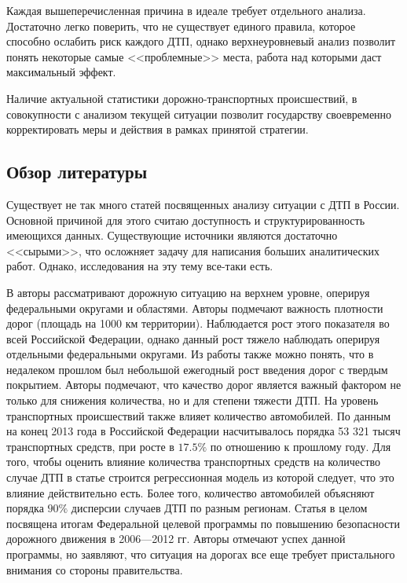 \documentclass[a4paper, 14pt]{article}
\begin{document}
Каждая вышеперечисленная причина в идеале требует отдельного анализа. Достаточно легко поверить, что не существует единого правила, которое способно ослабить риск каждого ДТП, однако верхнеуровневый анализ позволит понять некоторые самые <<проблемные>> места, работа над которыми даст максимальный эффект.

Наличие актуальной статистики дорожно-транспортных происшествий, в совокупности с анализом текущей ситуации позволит государству своевременно корректировать меры и действия в рамках принятой стратегии. 

\subsection{Обзор литературы}
Существует не так много статей посвященных анализу ситуации с ДТП в России. Основной причиной для этого считаю доступность и структурированность имеющихся данных. Существующие источники являются достаточно <<сырыми>>, что осложняет задачу для написания больших аналитических работ. Однако, исследования на эту тему все-таки есть.

В \cite{ivliev_econ_stat_analysis} авторы рассматривают дорожную ситуацию на верхнем уровне, оперируя федеральными округами и областями. Авторы подмечают важность плотности дорог (площадь на 1000 км территории). Наблюдается рост этого показателя во всей Российской Федерации, однако данный рост тяжело наблюдать оперируя отдельными федеральными округами. Из работы также можно понять, что в недалеком прошлом был небольшой ежегодный рост введения дорог с твердым покрытием. Авторы подмечают, что качество дорог является важный фактором не только для снижения количества, но и для степени тяжести ДТП. На уровень транспортных происшествий также влияет количество автомобилей. По данным на конец 2013 года в Российской Федерации насчитывалось порядка 53 321 тысяч транспортных средств, при росте в $17.5\%$ по отношению к прошлому году. Для того, чтобы оценить влияние количества транспортных средств на количество случае ДТП в статье строится регрессионная модель из которой следует, что это влияние действительно есть. Более того, количество автомобилей объясняют порядка $90\%$ дисперсии случаев ДТП по разным регионам. Статья в целом посвящена итогам Федеральной целевой программы по повышению безопасности дорожного движения в 2006---2012 гг. Авторы отмечают успех данной программы, но заявляют, что ситуация на дорогах все еще требует пристального внимания со стороны правительства.
\end{document}
